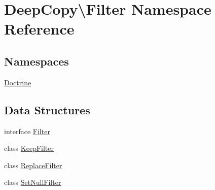 \hypertarget{namespace_deep_copy_1_1_filter}{}\section{Deep\+Copy\textbackslash{}Filter Namespace Reference}
\label{namespace_deep_copy_1_1_filter}
\subsection*{Namespaces}
\begin{DoxyCompactItemize}
\item 
 \mbox{\hyperlink{namespace_deep_copy_1_1_filter_1_1_doctrine}{Doctrine}}
\end{DoxyCompactItemize}
\subsection*{Data Structures}
\begin{DoxyCompactItemize}
\item 
interface \mbox{\hyperlink{interface_deep_copy_1_1_filter_1_1_filter}{Filter}}
\item 
class \mbox{\hyperlink{class_deep_copy_1_1_filter_1_1_keep_filter}{Keep\+Filter}}
\item 
class \mbox{\hyperlink{class_deep_copy_1_1_filter_1_1_replace_filter}{Replace\+Filter}}
\item 
class \mbox{\hyperlink{class_deep_copy_1_1_filter_1_1_set_null_filter}{Set\+Null\+Filter}}
\end{DoxyCompactItemize}
